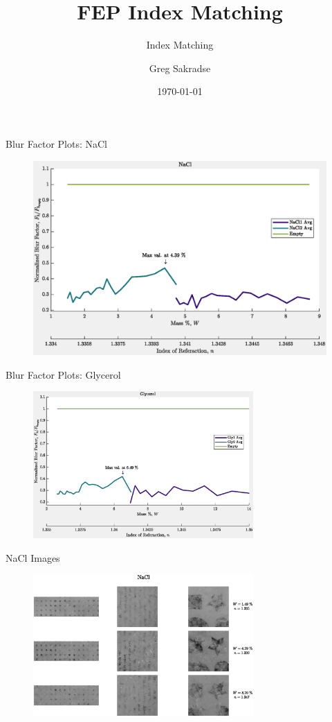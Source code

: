 \documentclass[10pt]{beamer}
\title{FEP Index Matching}
\subtitle{Index Matching}
\date{\today}
\author{Greg Sakradse}
\begin{document}
\begin{frame}{Blur Factor Plots: NaCl}
\begin{figure}
    \centering
    \includegraphics[width = 0.75 \textwidth]{figs/NaCl_BlurPlot.eps}
    \label{NaClBlur}
\end{figure}
    
\end{frame}

\begin{frame}{Blur Factor Plots: Glycerol}
\begin{figure}
    \centering
    \includegraphics[width = 0.75\textwidth]{figs/Gly_BlurPlot.eps}
    \label{NaClBlur}
\end{figure}
    
\end{frame}

\begin{frame}{NaCl Images}
\begin{figure}
    \centering
    \includegraphics[width = 0.75\textwidth]{figs/NaCl_Imgs.eps}
    \label{NaClImg}
\end{figure}
\end{frame}
\end{document}
